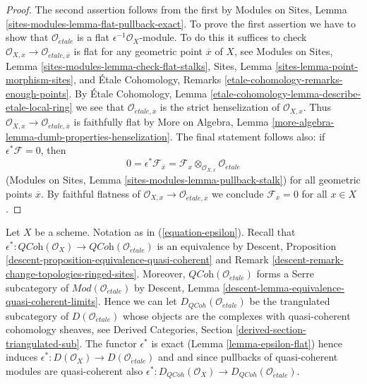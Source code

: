 \begin{proof}
The second assertion follows from the first by
Modules on Sites, Lemma \ref{sites-modules-lemma-flat-pullback-exact}.
To prove the first assertion we have to show that
$\mathcal{O}_{\acute{e}tale}$ is a flat $\epsilon^{-1}\mathcal{O}_X$-module.
To do this it suffices to check
$\mathcal{O}_{X, x} \to \mathcal{O}_{\acute{e}tale, \overline{x}}$
is flat for any geometric point $\overline{x}$ of $X$, see
Modules on Sites, Lemma
\ref{sites-modules-lemma-check-flat-stalks},
Sites, Lemma
\ref{sites-lemma-point-morphism-sites},
and
\'Etale Cohomology, Remarks
\ref{etale-cohomology-remarks-enough-points}.
By \'Etale Cohomology, Lemma
\ref{etale-cohomology-lemma-describe-etale-local-ring}
we see that $\mathcal{O}_{\acute{e}tale, \overline{x}}$ is the
strict henselization of $\mathcal{O}_{X, x}$. Thus
$\mathcal{O}_{X, x} \to \mathcal{O}_{\acute{e}tale, \overline{x}}$
is faithfully flat by More on Algebra,
Lemma \ref{more-algebra-lemma-dumb-properties-henselization}.
The final statement follows also: if $\epsilon^*\mathcal{F} = 0$, then
$$
0 = \epsilon^*\mathcal{F}_{\overline{x}} =
\mathcal{F}_x \otimes_{\mathcal{O}_{X, x}} \mathcal{O}_{\acute{e}tale}
$$
(Modules on Sites, Lemma \ref{sites-modules-lemma-pullback-stalk})
for all geometric points $\overline{x}$. By faithful flatness of
$\mathcal{O}_{X, x} \to \mathcal{O}_{\acute{e}tale, \overline{x}}$
we conclude $\mathcal{F}_x = 0$ for all $x \in X$.
\end{proof}

\noindent
Let $X$ be a scheme. Notation as in (\ref{equation-epsilon}).
Recall that $\epsilon^* : \textit{QCoh}(\mathcal{O}_X)
\to \textit{QCoh}(\mathcal{O}_{\acute{e}tale})$
is an equivalence by
Descent, Proposition \ref{descent-proposition-equivalence-quasi-coherent} and
Remark \ref{descent-remark-change-topologies-ringed-sites}.
Moreover, $\textit{QCoh}(\mathcal{O}_{\acute{e}tale})$ forms a
Serre subcategory of
$\textit{Mod}(\mathcal{O}_{\acute{e}tale})$ by
Descent, Lemma \ref{descent-lemma-equivalence-quasi-coherent-limits}.
Hence we can let $D_{QCoh}(\mathcal{O}_{\acute{e}tale})$ be the trangulated
subcategory of $D(\mathcal{O}_{\acute{e}tale})$ whose objects are the
complexes with quasi-coherent cohomology sheaves, see
Derived Categories, Section \ref{derived-section-triangulated-sub}.
The functor $\epsilon^*$ is exact (Lemma \ref{lemma-epsilon-flat})
hence induces
$\epsilon^* :  D(\mathcal{O}_X) \to D(\mathcal{O}_{\acute{e}tale})$
and and since pullbacks of quasi-coherent modules are quasi-coherent
also $\epsilon^* : D_{QCoh}(\mathcal{O}_X) \to
D_{QCoh}(\mathcal{O}_{\acute{e}tale})$.

